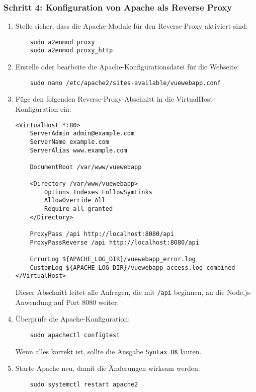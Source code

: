 \documentclass[a4paper,12pt]{article}
\begin{document}
\subsubsection{Schritt 4: Konfiguration von Apache als Reverse Proxy}
\begin{enumerate}
    \item Stelle sicher, dass die Apache-Module für den Reverse-Proxy aktiviert sind:

    \begin{lstlisting}
    sudo a2enmod proxy
    sudo a2enmod proxy_http
    \end{lstlisting}
    
    \item Erstelle oder bearbeite die Apache-Konfigurationsdatei für die Webseite:

    \begin{lstlisting}
    sudo nano /etc/apache2/sites-available/vuewebapp.conf
    \end{lstlisting}
    
    \item Füge den folgenden Reverse-Proxy-Abschnitt in die VirtualHost-Konfiguration ein:
    
    \begin{lstlisting}
<VirtualHost *:80>
    ServerAdmin admin@example.com
    ServerName example.com
    ServerAlias www.example.com

    DocumentRoot /var/www/vuewebapp

    <Directory /var/www/vuewebapp>
        Options Indexes FollowSymLinks
        AllowOverride All
        Require all granted
    </Directory>

    ProxyPass /api http://localhost:8080/api
    ProxyPassReverse /api http://localhost:8080/api

    ErrorLog ${APACHE_LOG_DIR}/vuewebapp_error.log
    CustomLog ${APACHE_LOG_DIR}/vuewebapp_access.log combined
</VirtualHost>
    \end{lstlisting}
    
    Dieser Abschnitt leitet alle Anfragen, die mit \texttt{/api} beginnen, an die Node.js-Anwendung auf Port 8080 weiter.

    \item Überprüfe die Apache-Konfiguration:

    \begin{lstlisting}
    sudo apachectl configtest
    \end{lstlisting}
    
    Wenn alles korrekt ist, sollte die Ausgabe \texttt{Syntax OK} lauten.

    \item Starte Apache neu, damit die Änderungen wirksam werden:

    \begin{lstlisting}
    sudo systemctl restart apache2
    \end{lstlisting}
\end{enumerate}
\end{document}

